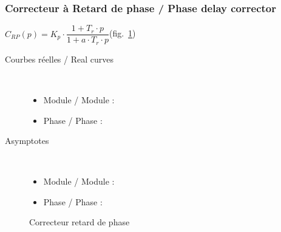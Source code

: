 \documentclass[a4paper,12pt]{article}                      %
\newcommand{\TradEnLigne}[2]{
#1 / {\color{blue}#2}
}
\begin{document}
\subsubsection{\TradEnLigne{Correcteur à Retard de phase}{Phase delay corrector}}

 $C_{RP}(p)=K_p\cdot\dfrac{1+ T_r \cdot p}{1+a\cdot T_r\cdot p}$(fig.~\ref{fig:corar})

\begin{description}
\item[\TradEnLigne{Courbes réelles}{Real curves}]~\\
\begin{itemize}
\item \TradEnLigne{Module}{Module}: 
\item \TradEnLigne{Phase}{Phase}: 
\end{itemize}
\item[Asymptotes]~\\
\begin{itemize}
\item \TradEnLigne{Module}{Module}:  
\item \TradEnLigne{Phase}{Phase}:  
\end{itemize}
\end{description}



\begin{figure}[!ht]
\centering
\begin{tikzexample}[title=,righthand width=0.5\textwidth,] 
\end{tikzexample}
\caption{Correcteur retard de phase}
\label{fig:corar}
\end{figure}


\newpage
\end{document}
